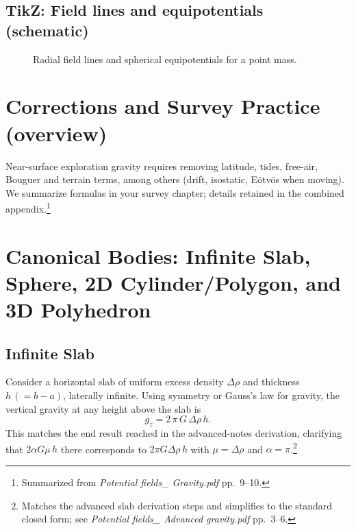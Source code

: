 \documentclass[11pt,a4paper]{article}
\begin{document}
\subsection*{TikZ: Field lines and equipotentials (schematic)}
\begin{figure}[h]
\centering
{}
\caption{Radial field lines and spherical equipotentials for a point mass.}
\end{figure}

\section{Corrections and Survey Practice (overview)}
Near-surface exploration gravity requires removing latitude, tides, free-air, Bouguer and terrain terms, among others (drift, isostatic, E\"otv\"os when moving). We summarize formulas in your survey chapter; details retained in the combined appendix.\footnote{Summarized from \emph{Potential fields\_ Gravity.pdf} pp.~9--10.}

\section{Canonical Bodies: Infinite Slab, Sphere, 2D Cylinder/Polygon, and 3D Polyhedron}

\subsection{Infinite Slab}
Consider a horizontal slab of uniform excess density $\Delta\rho$ and thickness $h\,(=b-a)$, laterally infinite. Using symmetry or Gauss's law for gravity, the vertical gravity at any height above the slab is
\begin{equation}
  g_z = 2\,\pi\,G\,\Delta\rho\,h.\label{eq:slab}
\end{equation}
This matches the end result reached in the advanced-notes derivation, clarifying that $2\alpha G \mu\,h$ there corresponds to $2\pi G\Delta\rho\,h$ with $\mu=\Delta\rho$ and $\alpha=\pi$.\footnote{Matches the advanced slab derivation steps and simplifies to the standard closed form; see \emph{Potential fields\_ Advanced gravity.pdf} pp.~3--6.}
\end{document}
